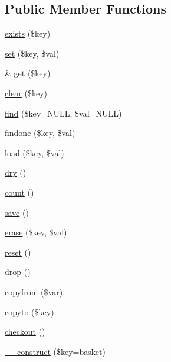 \subsection*{Public Member Functions}
\begin{DoxyCompactItemize}
\item 
\hyperlink{class_basket_ace1ae5be37bf26c172cc7ea4e1a65e26}{exists} (\$key)
\item 
\hyperlink{class_basket_ac8d8012023e560c81f55a629022cb65a}{set} (\$key, \$val)
\item 
\& \hyperlink{class_basket_ac3695923790b06917410e205068b8376}{get} (\$key)
\item 
\hyperlink{class_basket_a10a949ef75de6c82c98ac555f371ba83}{clear} (\$key)
\item 
\hyperlink{class_basket_ae24293a6c7fb1d109eb000b7f9db35c1}{find} (\$key=N\+U\+LL, \$val=N\+U\+LL)
\item 
\hyperlink{class_basket_ad9ce70d0a094124bff4adcec3df5e30f}{findone} (\$key, \$val)
\item 
\hyperlink{class_basket_abc7666f1c00ea27802ea7f19bdec2d17}{load} (\$key, \$val)
\item 
\hyperlink{class_basket_acc3a900450447c51540aaa9dec5959a4}{dry} ()
\item 
\hyperlink{class_basket_ac751e87b3d4c4bf2feb03bee8b092755}{count} ()
\item 
\hyperlink{class_basket_afc8a3c62679cf00ade9f15fb2a6d6132}{save} ()
\item 
\hyperlink{class_basket_ae25b1f24d58b7b7e6cd08fc07183fae5}{erase} (\$key, \$val)
\item 
\hyperlink{class_basket_a4a20559544fdf4dcb457e258dc976cf8}{reset} ()
\item 
\hyperlink{class_basket_aeb639e5b2b713ed87ab8f2033af98ae8}{drop} ()
\item 
\hyperlink{class_basket_a462833da5009a82b31e39d3b5db38abd}{copyfrom} (\$var)
\item 
\hyperlink{class_basket_a4bcf54f913758fb093c35ea81fc29615}{copyto} (\$key)
\item 
\hyperlink{class_basket_ac41b8e359a8eb81494e030062e7b4bad}{checkout} ()
\item 
\hyperlink{class_basket_ae34d667a85d03b5da0154d74ae414768}{\+\_\+\+\_\+construct} (\$key=\textquotesingle{}basket\textquotesingle{})
\end{DoxyCompactItemize}
